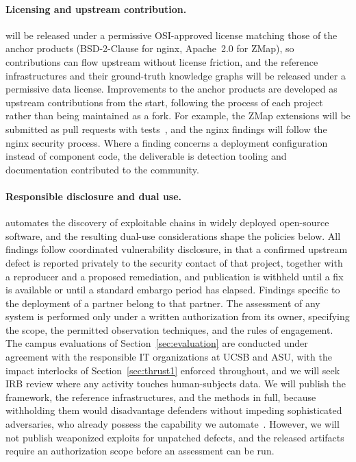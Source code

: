 \paragraph{Licensing and upstream contribution.}
\sysname will be released under a permissive OSI-approved license matching
those of the anchor products (BSD-2-Clause for nginx, Apache~2.0 for ZMap),
so contributions can flow upstream without license friction, and the reference infrastructures and their ground-truth knowledge
graphs will be released under a permissive data license. Improvements to the
anchor products are developed as upstream contributions from the start,
following the process of each project rather than being maintained as a fork.
For example, the ZMap extensions will be submitted as pull requests with
tests~\cite{zmapsrc}, and the nginx findings will follow the nginx security
process. Where a finding concerns a deployment configuration instead of component code,
the deliverable is detection tooling and documentation contributed to the
community.

\paragraph{Responsible disclosure and dual use.}
\sysname automates the discovery of exploitable chains in widely deployed
open-source software, and the resulting dual-use considerations shape the
policies below. All findings follow coordinated vulnerability disclosure, in that a confirmed
upstream defect is reported privately to the security contact of that
project, together with a reproducer and a proposed remediation, and
publication is withheld until a fix is available or until a standard embargo
period has elapsed. Findings specific to the deployment of a partner belong
to that partner. The assessment of any system is performed only under a written authorization
from its owner, specifying the scope, the permitted observation techniques,
and the rules of engagement. The campus evaluations of Section~\ref{sec:evaluation} are conducted under
agreement with the responsible IT organizations at UCSB and ASU, with the
impact interlocks of Section~\ref{sec:thrust1} enforced throughout, and we
will seek IRB review where any activity touches human-subjects data. We will publish the framework, the reference infrastructures, and the methods
in full, because withholding them would disadvantage defenders without
impeding sophisticated adversaries, who already possess the capability we
automate~\cite{measuring}. However, we will not publish weaponized exploits
for unpatched defects, and the released artifacts require an authorization
scope before an assessment can be run.
